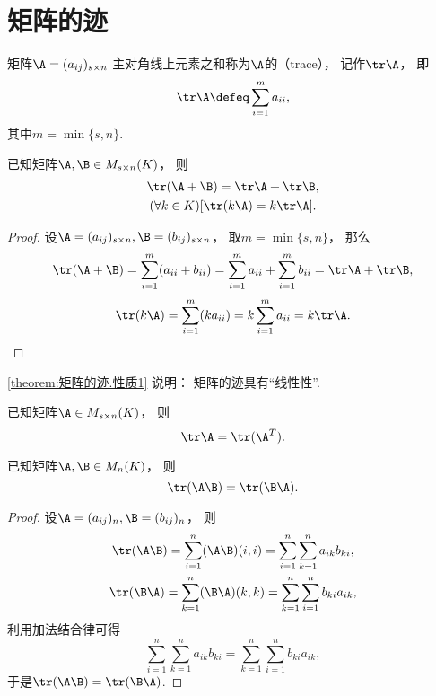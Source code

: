 \section{矩阵的迹}
\begin{definition}
矩阵\(\A=(a_{ij})_{s \times n}\)
主对角线上元素之和称为\(\A\)的（trace），
记作\(\tr\A\)，
即\[
	\tr\A
	\defeq
	\sum_{i=1}^m a_{ii},
\]
其中\(m = \min\{s,n\}\).
\end{definition}

\begin{property}\label{theorem:矩阵的迹.性质1}
已知矩阵\(\A,\B \in M_{s \times n}(K)\)，
则\begin{gather}
	\tr(\A+\B) = \tr\A + \tr\B, \\
	(\forall k \in K)[\tr(k \A) = k \tr\A].
\end{gather}
\begin{proof}
设\(\A=(a_{ij})_{s \times n},
\B=(b_{ij})_{s \times n}\)，
取\(m = \min\{s,n\}\)，
那么\[
	\tr(\A+\B) = \sum_{i=1}^m (a_{ii}+b_{ii})
	= \sum_{i=1}^m a_{ii}
	+ \sum_{i=1}^m b_{ii}
	= \tr\A + \tr\B,
\]\[
	\tr(k \A) = \sum_{i=1}^m (k a_{ii})
	= k \sum_{i=1}^m a_{ii}
	= k \tr\A.
	\qedhere
\]
\end{proof}
\end{property}
\begin{remark}
\cref{theorem:矩阵的迹.性质1} 说明：
矩阵的迹具有“线性性”.
\end{remark}

\begin{property}\label{theorem:矩阵的迹.性质2}
已知矩阵\(\A \in M_{s \times n}(K)\)，
则\begin{equation}
	\tr\A = \tr(\A^T).
\end{equation}
\end{property}

\begin{property}\label{theorem:矩阵的迹.矩阵乘积交换次序不变迹}
已知矩阵\(\A,\B \in M_n(K)\)，
则\begin{equation}
	\tr(\A\B) = \tr(\B\A).
\end{equation}
\begin{proof}
设\(\A = (a_{ij})_n,
\B = (b_{ij})_n\)，
则\begin{gather*}
	\tr(\A\B)
	= \sum_{i=1}^n (\A\B)(i,i)
	= \sum_{i=1}^n \sum_{k=1}^n a_{ik} b_{ki}, \\
	\tr(\B\A)
	= \sum_{k=1}^n (\B\A)(k,k)
	= \sum_{k=1}^n \sum_{i=1}^n b_{ki} a_{ik},
\end{gather*}
利用加法结合律可得\[
	\sum_{i=1}^n \sum_{k=1}^n a_{ik} b_{ki}
	= \sum_{k=1}^n \sum_{i=1}^n b_{ki} a_{ik},
\]
于是\(\tr(\A\B) = \tr(\B\A)\).
\end{proof}
\end{property}

